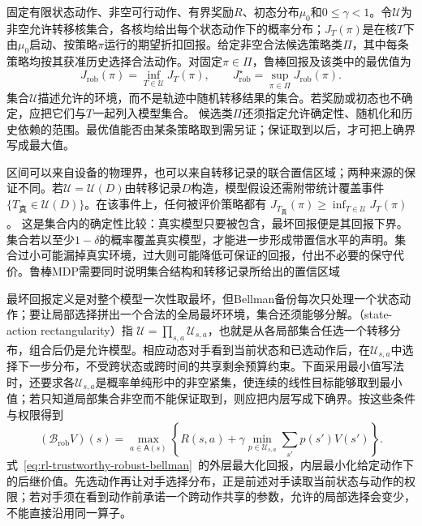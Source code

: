 \begin{definition}[最坏情形回报]
  \label{def:rl-trustworthy-robust-return}
  固定有限状态动作、非空可行动作、有界奖励$R$、初态分布$\mu_0$和$0\leq\gamma<1$。令$\mathcal U$为非空允许转移核集合，各核均给出每个状态动作下的概率分布；$J_T(\pi)$是在核$T$下由$\mu_0$启动、按策略$\pi$运行的期望折扣回报。给定非空合法候选策略类$\Pi$，其中每条策略均按其获准历史选择合法动作。对固定$\pi\in\Pi$，鲁棒回报及该类中的最优值为
  \[
    J_{\mathrm{rob}}(\pi)=\inf_{T\in\mathcal U}J_T(\pi),
    \qquad J_{\mathrm{rob}}^\star=\sup_{\pi\in\Pi}J_{\mathrm{rob}}(\pi).
  \]
  集合$\mathcal U$描述允许的环境，而不是轨迹中随机转移结果的集合。若奖励或初态也不确定，应把它们与$T$一起列入模型集合。
  候选类$\Pi$还须指定允许确定性、随机化和历史依赖的范围。最优值能否由某条策略取到需另证；保证取到以后，才可把上确界写成最大值。
\end{definition}

区间可以来自设备的物理界，也可以来自转移记录的联合置信区域；两种来源的保证不同。若$\mathcal U=\mathcal U(D)$由转移记录$D$构造，模型假设还需附带统计覆盖事件
$\{T_{\text{真}}\in\mathcal U(D)\}$。在该事件上，任何被评价策略都有
$J_{T_{\text{真}}}(\pi)\geq\inf_{T\in\mathcal U}J_T(\pi)$。
这是集合内的确定性比较：真实模型只要被包含，最坏回报便是其回报下界。集合若以至少$1-\delta$的概率覆盖真实模型，才能进一步形成带置信水平的声明。集合过小可能漏掉真实环境，过大则可能降低可保证的回报，付出不必要的保守代价。鲁棒MDP需要同时说明集合结构和转移记录所给出的置信区域

最坏回报定义是对整个模型一次性取最坏，但Bellman备份每次只处理一个状态动作；要让局部选择拼出一个合法的全局最坏环境，集合还须能够分解。（state-action rectangularity）指
$\mathcal U=\prod_{s,a}\mathcal U_{s,a}$，也就是从各局部集合任选一个转移分布，组合后仍是允许模型。相应动态对手看到当前状态和已选动作后，在$\mathcal U_{s,a}$中选择下一步分布，不受跨状态或跨时间的共享剩余预算约束。下面采用最小值写法时，还要求各$\mathcal U_{s,a}$是概率单纯形中的非空紧集，使连续的线性目标能够取到最小值；若只知道局部集合非空而不能保证取到，则应把内层写成下确界。按这些条件与权限得到
\begin{equation}
  (\mathcal B_{\mathrm{rob}}V)(s)
    =\max_{a\in\mathsf A(s)}
      \left\{R(s,a)+\gamma
        \min_{p\in\mathcal U_{s,a}}\sum_{s'}p(s')V(s')\right\}.
  \label{eq:rl-trustworthy-robust-bellman}
\end{equation}
式~\eqref{eq:rl-trustworthy-robust-bellman}~的外层最大化回报，内层最小化给定动作下的后继价值。先选动作再让对手选择分布，正是前述对手读取当前状态与动作的权限；若对手须在看到动作前承诺一个跨动作共享的参数，允许的局部选择会变少，不能直接沿用同一算子。

